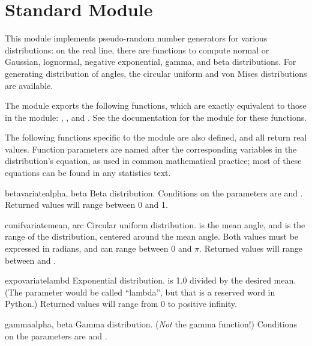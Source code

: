 \section{Standard Module }
\label{module-random}

This module implements pseudo-random number generators for various
distributions: on the real line, there are functions to compute normal
or Gaussian, lognormal, negative exponential, gamma, and beta
distributions.  For generating distribution of angles, the circular
uniform and von Mises distributions are available.

The module exports the following functions, which are exactly
equivalent to those in the  module:
, ,  and
.  See the documentation for the 
module for these functions.

The following functions specific to the  module are also
defined, and all return real values.  Function parameters are named
after the corresponding variables in the distribution's equation, as
used in common mathematical practice; most of these equations can be
found in any statistics text.

\begin{funcdesc}{betavariate}{alpha, beta}
Beta distribution.  Conditions on the parameters are
 and .
Returned values will range between 0 and 1.
\end{funcdesc}

\begin{funcdesc}{cunifvariate}{mean, arc}
Circular uniform distribution.   is the mean angle, and
 is the range of the distribution, centered around the mean
angle.  Both values must be expressed in radians, and can range
between 0 and $\pi$.  Returned values will range between
 and .
\end{funcdesc}

\begin{funcdesc}{expovariate}{lambd}
Exponential distribution.   is 1.0 divided by the desired
mean.  (The parameter would be called ``lambda'', but that is a
reserved word in Python.)  Returned values will range from 0 to
positive infinity.
\end{funcdesc}

\begin{funcdesc}{gamma}{alpha, beta}
Gamma distribution.  (\emph{Not} the gamma function!)  Conditions on
the parameters are  and .
\end{funcdesc}

